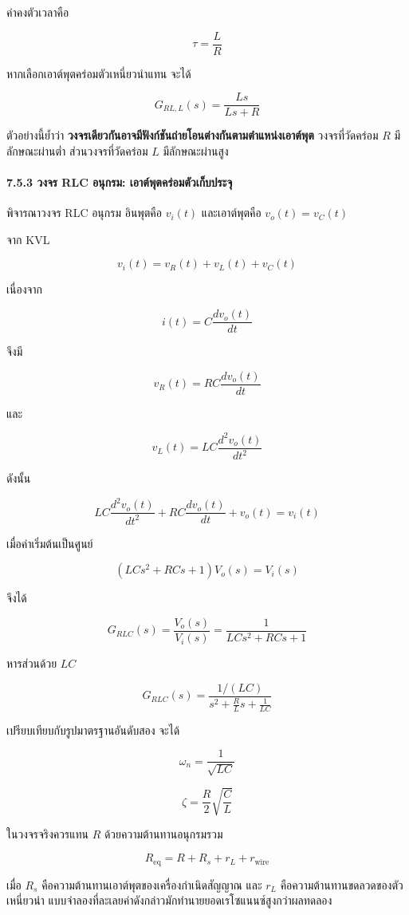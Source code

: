 ค่าคงตัวเวลาคือ

\[
\tau=\frac{L}{R}
\]

หากเลือกเอาต์พุตคร่อมตัวเหนี่ยวนำแทน จะได้

\[
\boxed{G_{RL,L}(s)=\frac{Ls}{Ls+R}}
\]

ตัวอย่างนี้ย้ำว่า \textbf{วงจรเดียวกันอาจมีฟังก์ชันถ่ายโอนต่างกันตามตำแหน่งเอาต์พุต} วงจรที่วัดคร่อม $R$ มีลักษณะผ่านต่ำ ส่วนวงจรที่วัดคร่อม $L$ มีลักษณะผ่านสูง

\paragraph{7.5.3 วงจร RLC อนุกรม: เอาต์พุตคร่อมตัวเก็บประจุ}

พิจารณาวงจร RLC อนุกรม อินพุตคือ $v_i(t)$ และเอาต์พุตคือ $v_o(t)=v_C(t)$

จาก KVL

\[
v_i(t)=v_R(t)+v_L(t)+v_C(t)
\]

เนื่องจาก

\[
i(t)=C\frac{dv_o(t)}{dt}
\]

จึงมี

\[
v_R(t)=RC\frac{dv_o(t)}{dt}
\]

และ

\[
v_L(t)=LC\frac{d^2v_o(t)}{dt^2}
\]

ดังนั้น

\[
LC\frac{d^2v_o(t)}{dt^2}
+RC\frac{dv_o(t)}{dt}
+v_o(t)=v_i(t)
\]

เมื่อค่าเริ่มต้นเป็นศูนย์

\[
\left(LCs^2+RCs+1\right)V_o(s)=V_i(s)
\]

จึงได้

\[
\boxed{G_{RLC}(s)=\frac{V_o(s)}{V_i(s)}
=\frac{1}{LCs^2+RCs+1}}
\]

หารส่วนด้วย $LC$

\[
G_{RLC}(s)=\frac{1/(LC)}
{s^2+\frac{R}{L}s+\frac{1}{LC}}
\]

เปรียบเทียบกับรูปมาตรฐานอันดับสอง จะได้

\[
\omega_n=\frac{1}{\sqrt{LC}}
\]

\[
\zeta=\frac{R}{2}\sqrt{\frac{C}{L}}
\]

ในวงจรจริงควรแทน $R$ ด้วยความต้านทานอนุกรมรวม

\[
R_{\text{eq}}=R+R_s+r_L+r_{\text{wire}}
\]

เมื่อ $R_s$ คือความต้านทานเอาต์พุตของเครื่องกำเนิดสัญญาณ และ $r_L$ คือความต้านทานขดลวดของตัวเหนี่ยวนำ แบบจำลองที่ละเลยค่าดังกล่าวมักทำนายยอดเรโซแนนซ์สูงกว่าผลทดลอง

